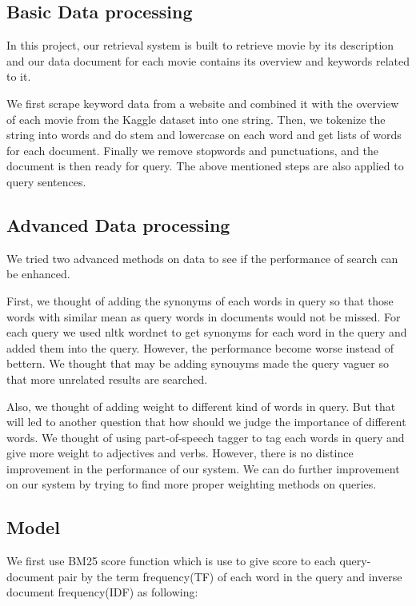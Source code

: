 \documentclass[letterpaper,10pt]{article}
\begin{document}
\begin{multicols}{2}
    \subsection{Basic Data processing}

    In this project, our retrieval system is built to retrieve movie by its description and our data document for each movie contains its overview and keywords related to it.
    
    We first scrape keyword data from a website and combined it with the overview of each movie from the Kaggle dataset into one string. Then, we tokenize the string into words and do stem and lowercase on each word and get lists of words for each document. Finally we remove stopwords and punctuations, and  the document is then ready for query. The above mentioned steps are also applied to query sentences.
    
    \subsection{Advanced Data processing}

    We tried two advanced methods on data to see if the performance of search can be enhanced.
    
    First, we thought of adding the synonyms of each words in query so that those words with similar mean as query words in documents would not be missed. For each query we used nltk wordnet to get synonyms for each word in the query and added them into the query. However, the performance become worse instead of bettern. We thought that may be adding synouyms made the query vaguer so that more unrelated results are searched. 
    
    Also, we thought of adding weight to different kind of words in query. But that will led to another question that how should we judge the importance of different words. We thought of using part-of-speech tagger to tag each words in query and give more weight to adjectives and verbs. However, there is no distince improvement in the performance of our system. We can do further improvement on our system by trying to find more proper weighting methods on queries.

    \subsection{Model}
    
    We first use BM25 score function which is use to give score to each query-document pair by the term frequency(TF) of each word in the query and inverse document frequency(IDF) as following:
    

\end{multicols}
\end{document}

